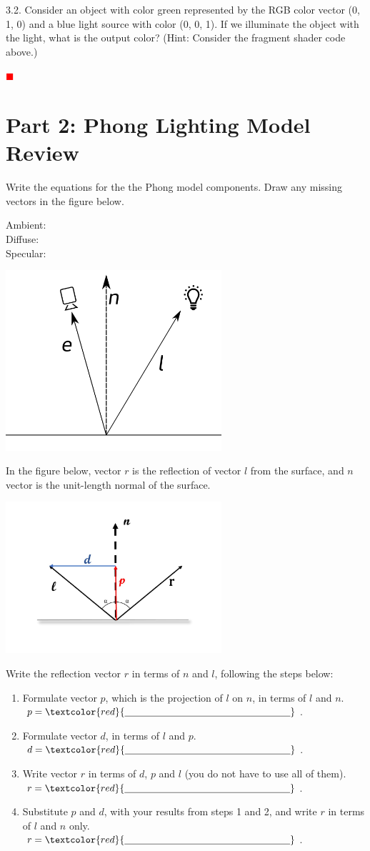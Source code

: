 \documentclass[12pt]{article}
\newcommand{\TODO}{\textcolor{red}{$\blacksquare$}}
\newcommand{\TODOL}[1]{\textcolor{red}{\underline{\hspace{#1 cm}}}}
\begin{document}
3.2. Consider an object with color green represented by the RGB color vector (0,
1, 0) and a blue light source with color (0, 0, 1). If we illuminate the object
with the light, what is the output color? (Hint: Consider the fragment shader code above.)

\TODO

\section*{Part 2: Phong Lighting Model Review}

Write the equations for the the Phong model components. Draw any missing vectors
in the figure below.

Ambient: \TODOL6\\
Diffuse: \TODOL6\\
Specular: \TODOL6

\includegraphics[width=8cm]{images/light-rays.png}

In the figure below, vector $r$ is the reflection of vector $l$ from the
surface, and $n$ vector is the unit-length normal of the surface.

\includegraphics[width=8cm]{images/reflection-direction.jpg}

Write the reflection vector $r$ in terms of $n$ and $l$, following the steps
below:
\begin{enumerate}
\item Formulate vector $p$, which is the projection of $l$ on $n$, in terms of
  $l$ and $n$. $p= \TODOL6$.
\item Formulate vector $d$, in terms of $l$ and $p$.  $d= \TODOL6$.
\item Write vector $r$ in terms of $d$, $p$ and $l$ (you do not have to use all
  of them). $r = \TODOL6$.
\item Substitute $p$ and $d$, with your results from steps 1 and 2, and write
  $r$ in terms of $l$ and $n$ only.  $r=\TODOL6$.
\end{enumerate}
\end{document}

